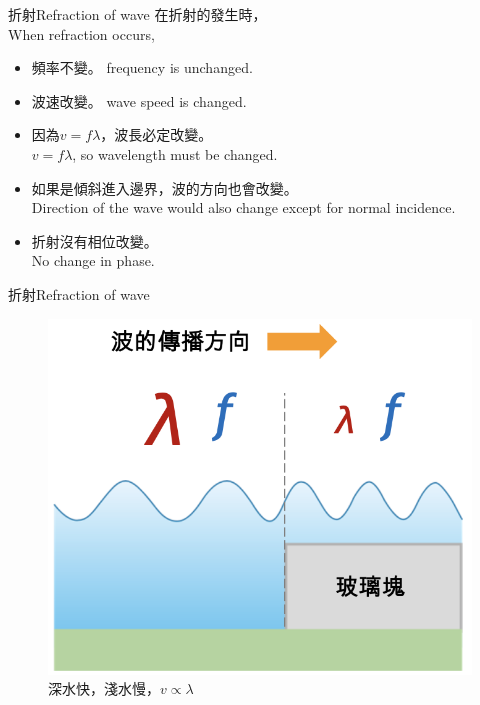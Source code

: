 \documentclass[beamer=true]{standalone}
\begin{document}
\begin{frame}{折射Refraction of wave}
    在折射的發生時，\\When refraction occurs,
    \begin{itemize}
        \item 頻率不變。 frequency is unchanged.
        \item 波速改變。 wave speed is changed.
        \item 因為\(v=f\lambda\)，波長必定改變。 \\\(v=f\lambda\), so wavelength must be changed.
        \item 如果是傾斜進入邊界，波的方向也會改變。 \\Direction of the wave would also change except for normal incidence.
        \item 折射沒有相位改變。 \\ No change in phase.
    \end{itemize}
\end{frame}

\begin{frame}{折射Refraction of wave}
    \begin{figure}
        \centering
        \includegraphics[width=0.7\linewidth]{images/Screenshot 2023-09-27 at 7.45.26 PM.png}
        \caption{深水快，淺水慢，$v\propto \lambda$}

    \end{figure}
\end{frame}
\end{document}
